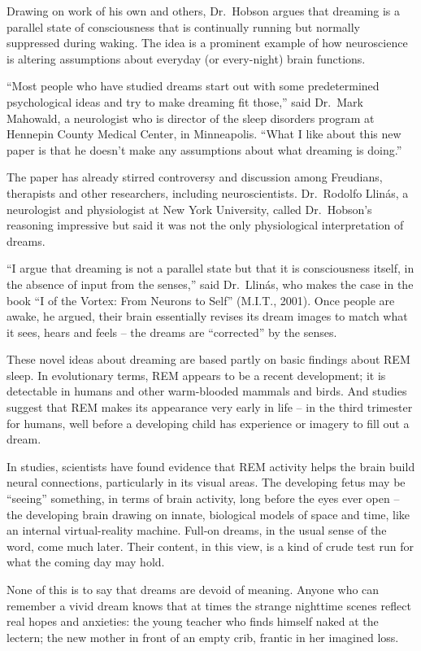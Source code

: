 ﻿\documentclass[12pt]{article}
\begin{document}
Drawing on work of his own and others, Dr.~Hobson argues that dreaming is a parallel state of
consciousness that is continually running but normally suppressed during waking. The idea is a
prominent example of how neuroscience is altering assumptions about everyday (or every-night) brain
functions.

``Most people who have studied dreams start out with some predetermined psychological ideas and try
to make dreaming fit those,'' said Dr.~Mark Mahowald, a neurologist who is director of the sleep
disorders program at Hennepin County Medical Center, in Minneapolis. ``What I like about this new
paper is that he doesn't make any assumptions about what dreaming is doing.''

The paper has already stirred controversy and discussion among Freudians, therapists and other
researchers, including neuroscientists. Dr.~Rodolfo Llin\'as, a neurologist and physiologist at New
York University, called Dr.~Hobson's reasoning impressive but said it was not the only physiological
interpretation of dreams.

``I argue that dreaming is not a parallel state but that it is consciousness itself, in the absence
of input from the senses,'' said Dr.~Llin\'as, who makes the case in the book ``I of the Vortex:
From Neurons to Self'' (M.I.T., 2001). Once people are awake, he argued, their brain essentially
revises its dream images to match what it sees, hears and feels -- the dreams are ``corrected'' by
the senses.

These novel ideas about dreaming are based partly on basic findings about REM sleep. In evolutionary
terms, REM appears to be a recent development; it is detectable in humans and other warm-blooded
mammals and birds. And studies suggest that REM makes its appearance very early in life -- in the
third trimester for humans, well before a developing child has experience or imagery to fill out a
dream.

In studies, scientists have found evidence that REM activity helps the brain build neural
connections, particularly in its visual areas. The developing fetus may be ``seeing'' something, in
terms of brain activity, long before the eyes ever open -- the developing brain drawing on innate,
biological models of space and time, like an internal virtual-reality machine. Full-on dreams, in
the usual sense of the word, come much later. Their content, in this view, is a kind of crude test
run for what the coming day may hold.

None of this is to say that dreams are devoid of meaning. Anyone who can remember a vivid dream
knows that at times the strange nighttime scenes reflect real hopes and anxieties: the young teacher
who finds himself naked at the lectern; the new mother in front of an empty crib, frantic in her
imagined loss.
\end{document}
